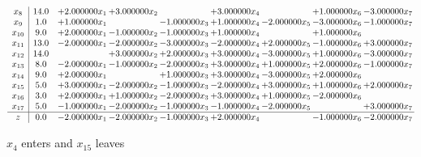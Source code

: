 \documentclass[10pt]{article}
\begin{document}
\[\begin{array}{c| c c@{\hskip 2pt} c@{\hskip 2pt} c@{\hskip 2pt} c@{\hskip 2pt} c@{\hskip 2pt} c@{\hskip 2pt} c@{\hskip 2pt} }
 x_{8}   &  14.0 & + 2.000000 x_{1} & + 3.000000 x_{2} &   & + 3.000000 x_{4} &   & + 1.000000 x_{6} & -3.000000 x_{7}\\
 x_{9}   &  1.0 & + 1.000000 x_{1} &   & -1.000000 x_{3} & + 1.000000 x_{4} & -2.000000 x_{5} & -3.000000 x_{6} & -1.000000 x_{7}\\
 x_{10}   &  9.0 & + 2.000000 x_{1} & -1.000000 x_{2} & -1.000000 x_{3} & + 1.000000 x_{4} &   & + 1.000000 x_{6} &   \\
 x_{11}   &  13.0 & -2.000000 x_{1} & -2.000000 x_{2} & -3.000000 x_{3} & -2.000000 x_{4} & + 2.000000 x_{5} & -1.000000 x_{6} & + 3.000000 x_{7}\\
 x_{12}   &  14.0  &   & + 3.000000 x_{2} & + 2.000000 x_{3} & + 3.000000 x_{4} & -3.000000 x_{5} & + 1.000000 x_{6} & -3.000000 x_{7}\\
 x_{13}   &  8.0 & -2.000000 x_{1} & -1.000000 x_{2} & -2.000000 x_{3} & + 3.000000 x_{4} & + 1.000000 x_{5} & + 2.000000 x_{6} & -1.000000 x_{7}\\
 x_{14}   &  9.0 & + 2.000000 x_{1} &   & + 1.000000 x_{3} & + 3.000000 x_{4} & -3.000000 x_{5} & + 2.000000 x_{6} &   \\
 x_{15}   &  5.0 & + 3.000000 x_{1} & -2.000000 x_{2} & -1.000000 x_{3} & -2.000000 x_{4} & + 3.000000 x_{5} & + 1.000000 x_{6} & + 2.000000 x_{7}\\
 x_{16}   &  3.0 & + 2.000000 x_{1} & + 1.000000 x_{2} & -2.000000 x_{3} & + 3.000000 x_{4} & + 1.000000 x_{5} & -2.000000 x_{6} &   \\
 x_{17}   &  5.0 & -1.000000 x_{1} & -2.000000 x_{2} & -1.000000 x_{3} & -1.000000 x_{4} & -2.000000 x_{5} &   & + 3.000000 x_{7}\\
\hline
z    &  0.0 & -2.000000 x_{1} & -2.000000 x_{2} & -1.000000 x_{3} & + 2.000000 x_{4} &   & -1.000000 x_{6} & -2.000000 x_{7}\\
\end{array}\]


 $ x_{4} $ enters and $ x_{15} $ leaves 
\end{document}

